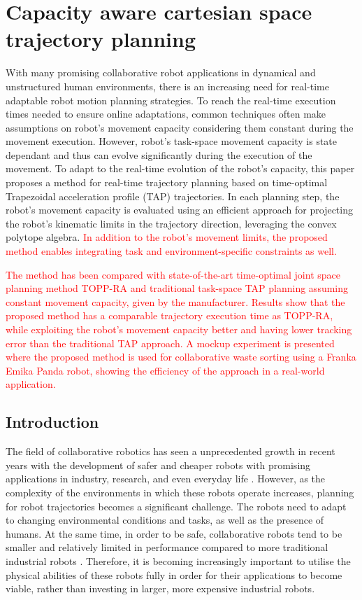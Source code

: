 
\chapter{Capacity aware cartesian space trajectory planning}
\label{ch:topca}

\newcommand{\DD}[1]{\textcolor{teal}{[dd] #1}}
\newcommand{\redo}[1]{\todo[inline]{[redo] #1}}

With many promising collaborative robot applications in dynamical and unstructured human environments, there is an increasing need for real-time adaptable robot motion planning strategies. To reach the real-time execution times needed to ensure online adaptations, common techniques often make assumptions on robot's movement capacity considering them constant during the movement execution. However, robot's task-space movement capacity is state dependant and thus can evolve significantly during the execution of the movement.
To adapt to the real-time evolution of the robot's capacity, this paper proposes a method for real-time trajectory planning based on time-optimal Trapezoidal acceleration profile (TAP) trajectories. 
In each planning step, the robot's movement capacity is evaluated using an efficient approach for projecting the robot's kinematic limits in the trajectory direction, leveraging the convex polytope algebra.
\textcolor{red}{In addition to the robot's movement limits, the proposed method enables integrating task and environment-specific constraints as well.}

\textcolor{red}{
The method has been compared with state-of-the-art time-optimal joint space planning method TOPP-RA and traditional task-space TAP planning assuming constant movement capacity, given by the manufacturer. Results show that the proposed method has a comparable trajectory execution time as TOPP-RA, while exploiting the robot's movement capacity better and having lower tracking error than the traditional TAP approach. A mockup experiment is presented where the proposed method is used for collaborative waste sorting using a Franka Emika Panda robot, showing the efficiency of the approach in a real-world application.}

\section{Introduction}

The field of collaborative robotics has seen a unprecedented growth in recent years with the development of safer and cheaper robots with promising applications in industry, research, and even everyday life \cite{ajoudani2018progress}. However, as the complexity of the environments in which these robots operate increases, planning for robot trajectories becomes a significant challenge.  The robots need to adapt to changing environmental conditions and tasks, as well as the presence of humans. 
At the same time, in order to be safe, collaborative robots tend to be smaller and relatively limited in performance compared to more traditional industrial robots \cite{smu}. Therefore, it is becoming increasingly important to utilise the physical abilities of these robots fully in order for their applications to become viable, rather than investing in larger, more expensive industrial robots. 

